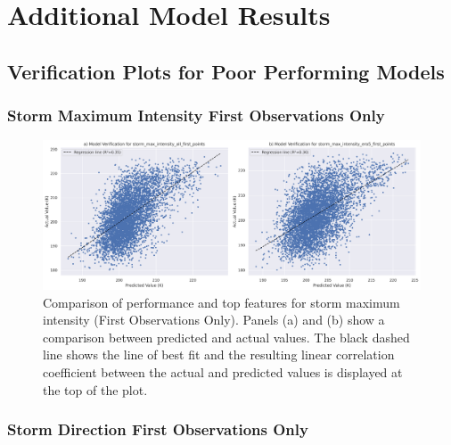 \chapter{Additional Model Results}
\label{appn:modelresults}

\section{Verification Plots for Poor Performing Models}

\subsection{Storm Maximum Intensity First Observations Only}

\begin{figure}[ht]
    \centering
    \includegraphics[width=\textwidth]{../figures/generated/experiments/storm_max_intensity_first_points/storm_max_intensity_first_points_summary.png}
    \caption{Comparison of performance and top features for storm maximum intensity (First Observations Only). Panels (a) and (b) show a comparison between predicted and actual values. The black dashed line shows the line of best fit and the resulting linear correlation coefficient between the actual and predicted values is displayed at the top of the plot.}
    \label{fig:storm_max_intensity_first_points_summary}
\end{figure}

\clearpage
\subsection{Storm Direction First Observations Only}

